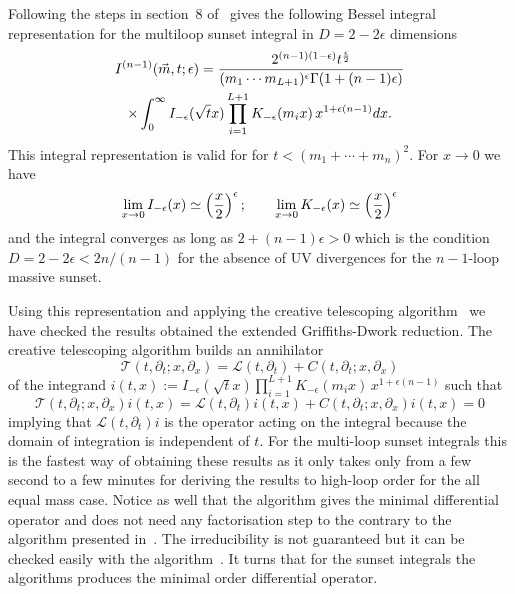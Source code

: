 \documentclass[a4paper,12pt]{article}
\numberwithin{equation}{section}
\numberwithin{figure}{subsection}
\theoremstyle{plain}
\theoremstyle{plain}
\theoremstyle{definition}
\theoremstyle{plain}
\theoremstyle{remark}
\theoremstyle{plain}
\begin{document}
Following the steps in section~8 of~\cite{Vanhove:2014wqa}
gives the following Bessel integral representation for the multiloop
sunset integral in  $D=2-2\epsilon$ dimensions
\begin{multline}
  I^{(n-1)}(\vec m,t;\epsilon)=
  {2^{(n-1) (1-\epsilon)} t^{\epsilon\over2} \over    (m_1\cdots m_{L+1})^{\epsilon}
  \Gamma(1+(n-1)\epsilon)}\cr\times\int_0^\infty I_{-\epsilon}(\sqrt{t} x)
  \prod_{i=1}^{L+1}K_{-\epsilon}(m_ix)\,  x^{1+\epsilon(n-1)}dx.
\end{multline}
This integral representation is valid for   for $t<(m_1+\cdots +m_{n})^2$.
%
For $x\to0$ we have
\begin{equation}
  \lim_{x\to0} I_{-\epsilon}(x)\simeq \left(x\over2\right)^{\epsilon};    \qquad
  \lim_{x\to0} K_{-\epsilon}(x)   \simeq \left(x\over2\right)^{\epsilon}
\end{equation}
and the integral converges as long as $2+(n-1)\epsilon>0$ which is the
condition $D=2-2\epsilon< 2n/(n-1)$ for the absence of UV divergences
for the $n-1$-loop massive sunset.

Using this representation and applying the creative telescoping
algorithm~\cite{Chyzak,Chyzak2,bostan2013creative,Koutchan} we have checked the results obtained the
extended Griffiths-Dwork reduction.
The creative telescoping algorithm builds an annihilator
\begin{equation}
  \mathscr{T}(t,\partial_t; x,\partial_x)= \mathscr{L}(t,\partial_t)+ C(  t,\partial_t; x,\partial_x)
\end{equation}
of the integrand
$i(t,x):= I_{-\epsilon}(\sqrt{t} x)
  \prod_{i=1}^{L+1}K_{-\epsilon}(m_ix)\,  x^{1+\epsilon(n-1)}$
such that
\begin{equation}
      \mathscr{T}(t,\partial_t; x,\partial_x) i(t,x)=\mathscr{L}(t,\partial_t)i(t,x)+ C(  t,\partial_t; x,\partial_x) i(t,x)=0
    \end{equation}
    implying that $\mathscr{L}(t,\partial_t)i$ is the operator acting
    on the integral because the domain of integration is independent
    of $t$.
For the multi-loop sunset
integrals this is the fastest way of obtaining these results as it
only takes only from a few second to a few minutes for deriving the
results to high-loop order for the all equal mass case. Notice as well
that the algorithm gives the minimal  differential operator and does
not need any factorisation step to the contrary to the algorithm
presented in~\cite{Pogel:2022vat}. The irreducibility is not guaranteed
but it can be checked easily with the algorithm~\cite{chyzak2022symbolic,goyer2021sage}. It
turns that for the sunset integrals the algorithms produces the
minimal order differential operator.
\end{document}

